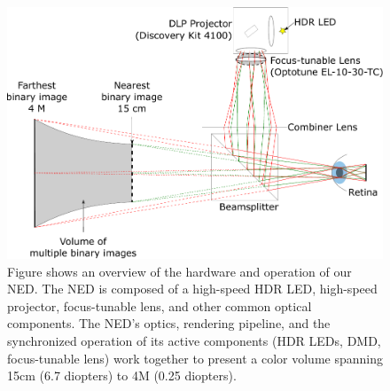 \begin{figure}[tb!]
\centering
\includegraphics[width=0.99\columnwidth]{images/volumetric/proposedCandidate}
\caption[Volumetric NED: optics overview]{Figure shows an overview of the hardware and operation of our NED. The NED is composed of a high-speed HDR LED, high-speed projector, focus-tunable lens, and other common optical components. The NED's optics, rendering pipeline, and the synchronized operation of its active components (HDR LEDs, DMD, focus-tunable lens) work together to present a color volume spanning 15cm (6.7 diopters) to 4M (0.25 diopters).}
\label{fig:volumetric:proposedCandidate}
\end{figure}